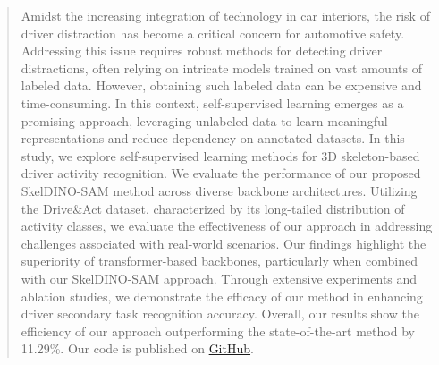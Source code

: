 \begin{abstract}
Amidst the increasing integration of technology in car interiors, the risk of driver distraction has become a critical concern for automotive safety. Addressing this issue requires robust methods for detecting driver distractions, often relying on intricate models trained on vast amounts of labeled data. 
However, obtaining such labeled data can be expensive and time-consuming.
In this context, self-supervised learning emerges as a promising approach, leveraging unlabeled data to learn meaningful representations and reduce dependency on annotated datasets.
In this study, we explore self-supervised learning methods for 3D skeleton-based driver activity recognition. We evaluate the performance of our proposed SkelDINO-SAM method across diverse backbone architectures.
Utilizing the Drive\&Act dataset, characterized by its long-tailed distribution of activity classes, we evaluate the effectiveness of our approach in addressing challenges associated with real-world scenarios.
Our findings highlight the superiority of transformer-based backbones, particularly when combined with our SkelDINO-SAM approach. 
Through extensive experiments and ablation studies, we demonstrate the efficacy of our method in enhancing driver secondary task recognition accuracy. 
Overall, our results show the efficiency of our approach outperforming the state-of-the-art method by 11.29\%. Our code is published on \href{https://github.com/davidjlerch/darssl}{GitHub}.
\end{abstract}